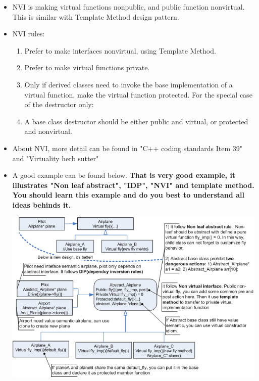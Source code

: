\documentclass[a4paper,11pt,twoside]{book}
\begin{document}
\begin{itemize}
	

	\item NVI is making virtual functions nonpublic, and public function nonvirtual. This is similar with Template Method design pattern.  

\item NVI rules:
\begin{enumerate}
	\item Prefer to make interfaces nonvirtual, using Template Method.
	
	\item Prefer to make virtual functions private.
	
	\item Only if derived classes need to invoke the base implementation of a virtual function, make the virtual function protected. For the special case of the destructor only:
	
	\item A base class destructor should be either public and virtual, or protected and nonvirtual.
\end{enumerate}

\item About NVI, more detail can be found in "C++ coding standards Item 39" and "Virtuality herb sutter"

\item A good example can be found below. \textbf{That is very good example, it illustrates "Non leaf abstract", "IDP", "NVI" and template method. You should learn this example and do you best to understand all ideas behinds it. }

	\centering
	\includegraphics[width=0.93\linewidth]{pics/NVI.png}


\end{itemize}
\end{document}

